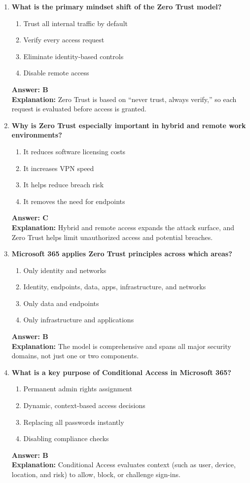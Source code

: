 \documentclass[10pt]{article}
\begin{document}
\begin{enumerate}[leftmargin=*]

\item \textbf{What is the primary mindset shift of the Zero Trust model?}
\begin{enumerate}[label=\Alph*.]
  \item Trust all internal traffic by default
  \item Verify every access request
  \item Eliminate identity-based controls
  \item Disable remote access
\end{enumerate}
\textbf{Answer: B}\\
\textbf{Explanation:} Zero Trust is based on ``never trust, always verify,'' so each request is evaluated before access is granted.

\item \textbf{Why is Zero Trust especially important in hybrid and remote work environments?}
\begin{enumerate}[label=\Alph*.]
  \item It reduces software licensing costs
  \item It increases VPN speed
  \item It helps reduce breach risk
  \item It removes the need for endpoints
\end{enumerate}
\textbf{Answer: C}\\
\textbf{Explanation:} Hybrid and remote access expands the attack surface, and Zero Trust helps limit unauthorized access and potential breaches.

\item \textbf{Microsoft 365 applies Zero Trust principles across which areas?}
\begin{enumerate}[label=\Alph*.]
  \item Only identity and networks
  \item Identity, endpoints, data, apps, infrastructure, and networks
  \item Only data and endpoints
  \item Only infrastructure and applications
\end{enumerate}
\textbf{Answer: B}\\
\textbf{Explanation:} The model is comprehensive and spans all major security domains, not just one or two components.

\item \textbf{What is a key purpose of Conditional Access in Microsoft 365?}
\begin{enumerate}[label=\Alph*.]
  \item Permanent admin rights assignment
  \item Dynamic, context-based access decisions
  \item Replacing all passwords instantly
  \item Disabling compliance checks
\end{enumerate}
\textbf{Answer: B}\\
\textbf{Explanation:} Conditional Access evaluates context (such as user, device, location, and risk) to allow, block, or challenge sign-ins.


\end{enumerate}
\end{document}
